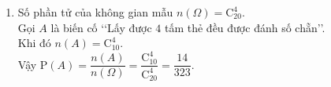 \begin{bt}
{\begin{enumerate}
	{\bf TH3:} $1$ bi xanh, $1$ bi đỏ, $2$ bi vàng: $\mathrm{C}_5^1\mathrm{C}_4^1\mathrm{C}_6^2$ (cách).\\
	Vậy $n(A)=\mathrm{C}_5^2\mathrm{C}_4^1\mathrm{C}_6^1+\mathrm{C}_5^1\mathrm{C}_4^2\mathrm{C}_6^1+\mathrm{C}_5^1\mathrm{C}_4^1\mathrm{C}_6^2=720$.\\
	Vậy $\mathrm{P}(A)=\dfrac{n(A)}{n(\Omega)}=\dfrac{48}{91}$.
	\item Số phần tử của không gian mẫu $n(\Omega)=\mathrm{C}_{20}^4$.\\
	Gọi $A$ là biến cố \lq\lq Lấy được $4$ tấm thẻ đều được đánh số chẵn\rq\rq.\\
	Khi đó $n(A)=\mathrm{C}_{10}^4$.\\
	Vậy $\mathrm{P}(A)=\dfrac{n(A)}{n(\Omega)}=\dfrac{\mathrm{C}_{10}^4}{\mathrm{C}_{20}^4}=\dfrac{14}{323}$.
\end{enumerate}
}
\end{bt}

